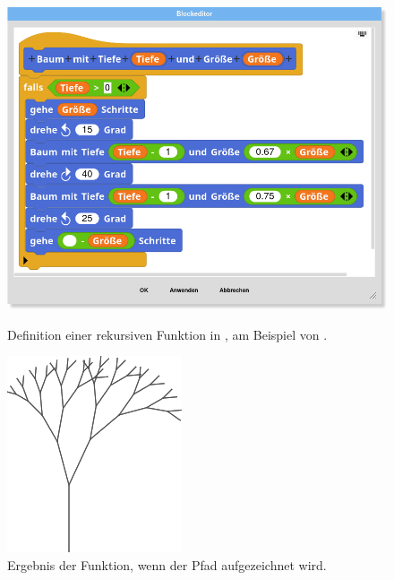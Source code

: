 \begin{figure}[!ht]
  \includegraphics[width=\linewidth]{assets/snap-edit.png}
  \caption{Definition einer rekursiven Funktion in \Snap{}, am Beispiel von \textcite{harveyBringingNo2010}.}
  \label{fig:snap-edit}
  \endminipage
  \hfill
  \begin{minipage}[t]{.405\textwidth}
    \includegraphics[width=\linewidth]{assets/snap-tree.png}
    \caption{Ergebnis der Funktion, wenn der Pfad aufgezeichnet wird.}
    \label{fig:snap-tree}
  \end{minipage}
\end{figure}

